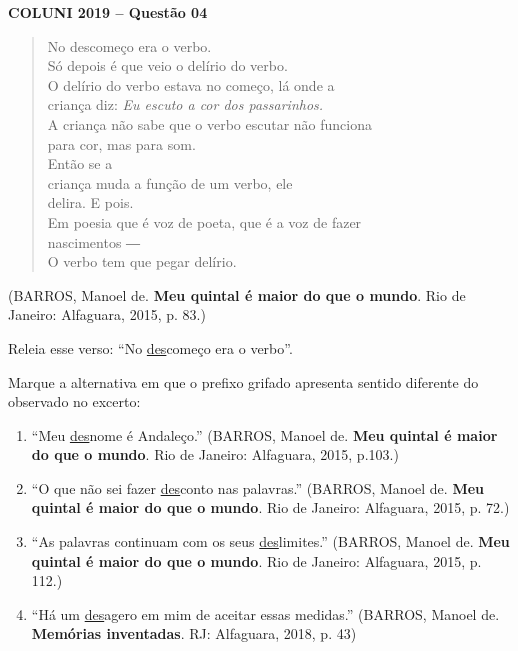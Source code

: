 \textbf{COLUNI 2019 -- Questão 04}\par\medskip \begin{center}\begin{verse}
No descomeço era o verbo.\\
Só depois é que veio o delírio do verbo.\\
O delírio do verbo estava no começo, lá onde a\\
criança diz: \textit{Eu escuto a cor dos passarinhos.}\\
A criança não sabe que o verbo escutar não funciona\\
para cor, mas para som.\\
Então se a\\
criança muda a função de um verbo, ele\\
delira. E pois.\\
Em poesia que é voz de poeta, que é a voz de fazer\\
nascimentos ―\\
O verbo tem que pegar delírio.
\end{verse}
(BARROS, Manoel de. \textbf{Meu quintal é maior do que o mundo}. Rio de Janeiro: Alfaguara, 2015, p. 83.)\end{center}

Releia esse verso: “No \underline{des}começo era o verbo”.

\par

Marque a alternativa em que o prefixo grifado apresenta sentido diferente do observado no excerto:\begin{enumerate}
\item “Meu \underline{des}nome é Andaleço.” (BARROS, Manoel de. \textbf{Meu quintal é maior do que o mundo}. Rio de Janeiro: Alfaguara, 2015, p.103.)
\item “O que não sei fazer \underline{des}conto nas palavras.” (BARROS, Manoel de. \textbf{Meu quintal é maior do que o mundo}. Rio de Janeiro: Alfaguara,
       2015, p. 72.)
\item “As palavras continuam com os seus \underline{des}limites.” (BARROS, Manoel de. \textbf{Meu quintal é maior do que o mundo}. Rio de Janeiro: Alfaguara,
       2015, p. 112.)
\item “Há um \underline{des}agero em mim de aceitar essas medidas.” (BARROS, Manoel de. \textbf{Memórias inventadas}. RJ: Alfaguara, 2018, p. 43)\end{enumerate}
